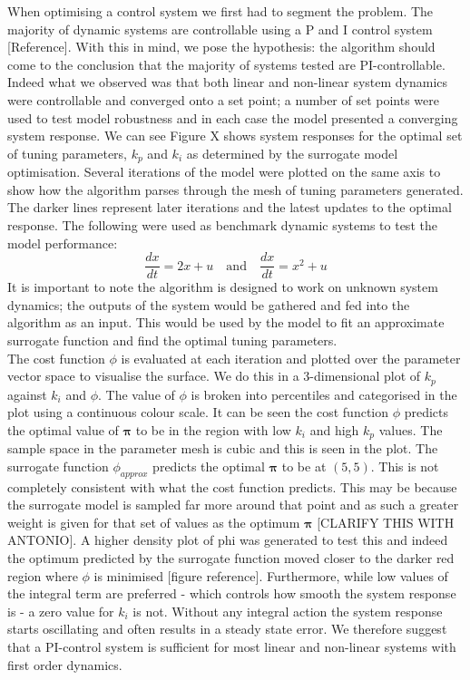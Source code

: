 \documentclass[conference]{IEEEtran}
\theoremstyle{definition}
\begin{document}
When optimising a control system we first had to segment the problem. The majority of dynamic systems are controllable using a P and I control system [Reference]. With this in mind, we pose the hypothesis: the algorithm should come to the conclusion that the majority of systems tested are PI-controllable. Indeed what we observed was that both linear and non-linear system dynamics were controllable and converged onto a set point; a number of set points were used to test model robustness and in each case the model presented a converging system response. We can see Figure X shows system responses for the optimal set of tuning parameters, $k_p$ and $k_i$  as determined by the surrogate model optimisation. Several iterations of the model were plotted on the same axis to show how the algorithm parses through the mesh of tuning parameters generated. The darker lines represent later iterations and the latest updates to the optimal response. The following were used as benchmark dynamic systems to test the model performance:
\begin{equation}
\frac{dx}{dt} = 2x +u \quad \textrm{and} \quad \frac{dx}{dt} = x^2 + u
\end{equation}
It is important to note the algorithm is designed to work on unknown system dynamics; the outputs of the system would be gathered and fed into the algorithm as an input. This would be used by the model to fit an approximate surrogate function and find the optimal tuning parameters.\\
The cost function $\phi$ is evaluated at each iteration and plotted over the parameter vector space to visualise the surface. We do this in a 3-dimensional plot of $k_p$ against $k_i$ and $\phi$. The value of $\phi$ is broken into percentiles and categorised in the plot using a continuous colour scale. It can be seen the cost function $\phi$ predicts the optimal value of $\boldsymbol \pi$ to be in the region with low $k_i$ and high $k_p$ values. The sample space in the parameter mesh is cubic and this is seen in the plot. The surrogate function $\phi_{approx}$ predicts the optimal $\boldsymbol \pi$ to be at $(5,5)$. This is not completely consistent with what the cost function predicts. This may be because the surrogate model is sampled far more around that point and as such a greater weight is given for that set of values as the optimum $\boldsymbol \pi$ [CLARIFY THIS WITH ANTONIO]. A higher density plot of phi was generated to test this and indeed the optimum predicted by the surrogate function moved closer to the darker red region where $\phi$ is minimised [figure reference].
Furthermore, while low values of the integral term are preferred - which controls how smooth the system response is - a zero value for $k_i$ is not. Without any integral action the system response starts oscillating and often results in a steady state error. We therefore suggest that a PI-control system is sufficient for most linear and non-linear systems with first order dynamics. 
\end{document}
